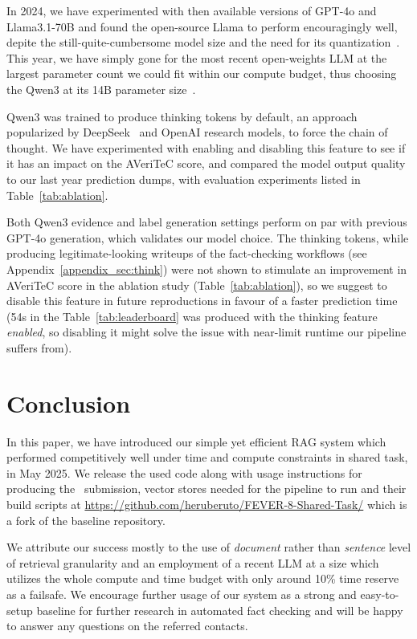 In 2024, we have experimented with then available versions of GPT-4o and Llama3.1-70B and found the open-source Llama to perform encouragingly well, depite the still-quite-cumbersome model size and the need for its quantization~\cite{ullrich-etal-2024-aic}.
This year, we have simply gone for the most recent open-weights LLM at the largest parameter count we could fit within our \averitec{} compute budget, thus choosing the Qwen3 at its 14B parameter size~\cite{yang2025qwen3technicalreport}.

Qwen3 was trained to produce thinking tokens by default, an approach popularized by DeepSeek~\cite{deepseekai2025deepseekr1incentivizingreasoningcapability} and OpenAI research models, to force the chain of thought.
We have experimented with enabling and disabling this feature to see if it has an impact on the AVeriTeC score, and compared the model output quality to our last year prediction dumps, with evaluation experiments listed in Table~\ref{tab:ablation}.

Both Qwen3 evidence and label generation settings perform on par with previous GPT-4o generation, which validates our model choice.
The thinking tokens, while producing legitimate-looking writeups of the fact-checking workflows (see Appendix~\ref{appendix_sec:think}) were not shown to stimulate an improvement in AVeriTeC score in the ablation study (Table~\ref{tab:ablation}), so we suggest to disable this feature in future reproductions in favour of a faster prediction time (54s in the Table~\ref{tab:leaderboard} was produced with the thinking feature \textit{enabled}, so disabling it might solve the issue with near-limit runtime our pipeline suffers from). 


\section{Conclusion}
In this paper, we have introduced our simple yet efficient RAG system which performed competitively well under time and compute constraints in \averitec{} shared task, in May 2025.
We release the used code along with usage instructions for producing the~\averitec{} submission, vector stores needed for the pipeline to run and their build scripts at 
\url{https://github.com/heruberuto/FEVER-8-Shared-Task/}
which is a fork of the \averitec{} baseline repository.

We attribute our success mostly to the use of \textit{document} rather than \textit{sentence} level of retrieval granularity and an employment of a recent LLM at a size which utilizes the whole compute and time budget with only around 10\% time reserve as a failsafe.
We encourage further usage of our system as a strong and easy-to-setup baseline for further research in automated fact checking and will be happy to answer any questions on the referred contacts.

